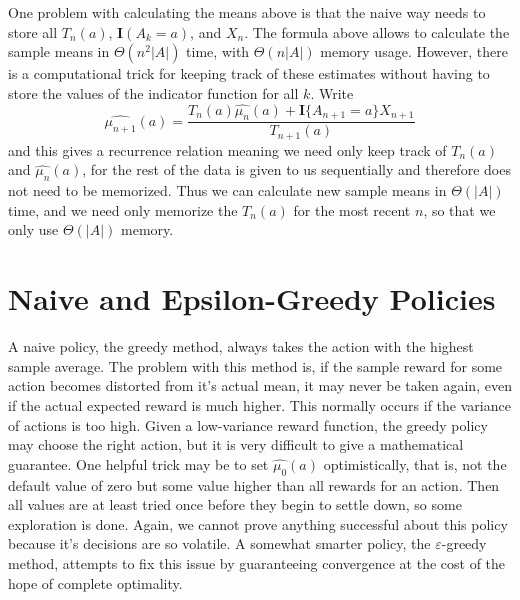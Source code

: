 One problem with calculating the means above is that the naive way needs to store all $T_n(a)$, $\mathbf{I}(A_k = a)$, and $X_n$. The formula above allows to calculate the sample means in $\Theta(n^2 |A|)$ time, with $\Theta(n|A|)$ memory usage. However, there is a computational trick for keeping track of these estimates without having to store the values of the indicator function for all $k$. Write
%
\[ \widehat{\mu_{n+1}}(a) = \frac{T_n(a) \widehat{\mu_n}(a) + \mathbf{I} \{ A_{n+1} = a \} X_{n+1}}{T_{n+1}(a)} \]
%
and this gives a recurrence relation meaning we need only keep track of $T_n(a)$ and $\widehat{\mu_n}(a)$, for the rest of the data is given to us sequentially and therefore does not need to be memorized. Thus we can calculate new sample means in $\Theta(|A|)$ time, and we need only memorize the $T_n(a)$ for the most recent $n$, so that we only use $\Theta(|A|)$ memory.

\section{Naive and Epsilon-Greedy Policies}

A naive policy, the greedy method, always takes the action with the highest sample average. The problem with this method is, if the sample reward for some action becomes distorted from it's actual mean, it may never be taken again, even if the actual expected reward is much higher. This normally occurs if the variance of actions is too high. Given a low-variance reward function, the greedy policy may choose the right action, but it is very difficult to give a mathematical guarantee. One helpful trick may be to set $\widehat{\mu_0}(a)$ optimistically, that is, not the default value of zero but some value higher than all rewards for an action. Then all values are at least tried once before they begin to settle down, so some exploration is done. Again, we cannot prove anything successful about this policy because it's decisions are so volatile. A somewhat smarter policy, the $\varepsilon$-greedy method, attempts to fix this issue by guaranteeing convergence at the cost of the hope of complete optimality.

